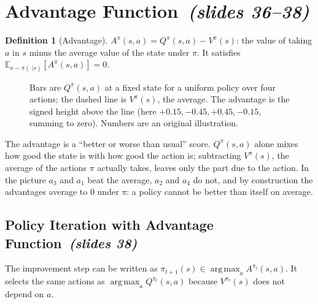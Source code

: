 \documentclass[11pt,a4paper]{article}
\newcommand{\E}{\mathbb{E}}
\DeclareMathOperator*{\argmax}{arg\,max}
\newcommand{\sltag}[1]{\texorpdfstring{\ \emph{(slides #1)}}{ (slides #1)}}
\theoremstyle{plain}
\theoremstyle{definition}
\newtheorem{definition}[theorem]{Definition}
\theoremstyle{remark}
\begin{document}
\section{Advantage Function\sltag{36--38}}
\begin{definition}[Advantage]\label{def:adv}
$A^\pi(s,a)=Q^\pi(s,a)-V^\pi(s)$: the value of taking $a$ in $s$ minus the average value of the state under $\pi$. It satisfies $\E_{a\sim\pi(\cdot|s)}[A^\pi(s,a)]=0$.
\end{definition}

\begin{figure}[h]
\centering
{}
\caption{Bars are $Q^\pi(s,a)$ at a fixed state for a uniform policy over four actions; the dashed line is $V^\pi(s)$, the average. The advantage is the signed height above the line (here $+0.15,-0.45,+0.45,-0.15$, summing to zero). Numbers are an original illustration.}
\end{figure}

\begin{intuition}
The advantage is a ``better or worse than usual'' score. $Q^\pi(s,a)$ alone mixes how good the state is with how good the action is; subtracting $V^\pi(s)$, the average of the actions $\pi$ actually takes, leaves only the part due to the action. In the picture $a_3$ and $a_1$ beat the average, $a_2$ and $a_4$ do not, and by construction the advantages average to $0$ under $\pi$: a policy cannot be better than itself on average.
\end{intuition}

\subsection{Policy Iteration with Advantage Function\sltag{38}}
The improvement step can be written as $\pi_{t+1}(s)\in\argmax_aA^{\pi_t}(s,a)$. It selects the same actions as $\argmax_aQ^{\pi_t}(s,a)$ because $V^{\pi_t}(s)$ does not depend on $a$.
\end{document}
